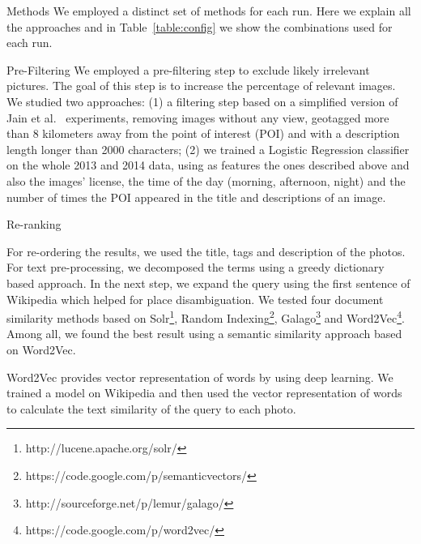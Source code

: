 \documentclass{acm_proc_article-me}
\begin{document}
\begin{section}{Methods}
We employed a distinct set of methods for each run. 
Here we explain all the approaches and in Table~\ref{table:config} we show the combinations used for each run.

\begin{subsection}{Pre-Filtering}
We employed a pre-filtering step to exclude likely irrelevant pictures.
The goal of this step is to increase the percentage of relevant images.
We studied two approaches: (1) a filtering step based on a simplified version of Jain et al.~\cite{wsp13} experiments, removing images without any view, geotagged more than 8 kilometers away from the point of interest (POI) and with a description length longer than 2000 characters; 
(2) we trained a Logistic Regression classifier on the whole 2013 and 2014 data, using as features the ones described above and also the images' license, the time of the day (morning, afternoon, night) and the number of times the POI appeared in the title and descriptions of an image.  
\end{subsection}


\begin{subsection}{Re-ranking}

For re-ordering the results, we used the title, tags and description of the photos. For text pre-processing, we decomposed the terms using a greedy dictionary based approach. In the next step, we expand the query using the first sentence of Wikipedia which helped for place disambiguation. We tested four document similarity methods based on Solr\footnote{http://lucene.apache.org/solr/}, Random Indexing\footnote{https://code.google.com/p/semanticvectors/}, Galago\footnote{http://sourceforge.net/p/lemur/galago/} and Word2Vec\footnote{https://code.google.com/p/word2vec/}\cite{word2vec}. Among all, we found the best result using a semantic similarity approach based on Word2Vec.

Word2Vec provides vector representation of words by using deep learning. We trained a model on Wikipedia and then used the vector representation of words to calculate the text similarity of the query to each photo.


\end{subsection}
\end{section}
\end{document}
